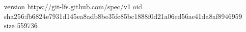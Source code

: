 version https://git-lfs.github.com/spec/v1
oid sha256:fb6824e7931d145ea8adb8be35fc85bc1888f0d21a06ed56ae41da8af8946959
size 559736
